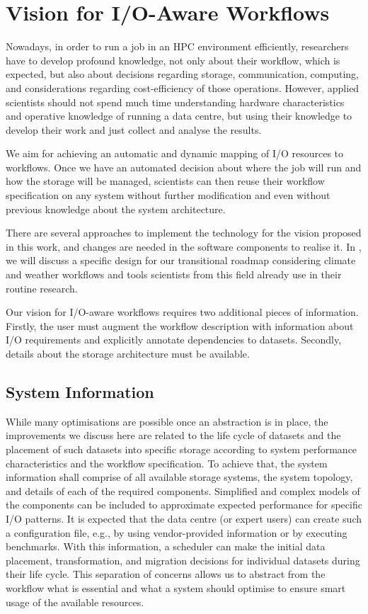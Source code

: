 \documentclass{superfri}
\begin{document}
\section{Vision for I/O-Aware Workflows}
\label{sec:vision}

Nowadays, in order to run a job in an HPC environment efficiently, researchers have to develop profound knowledge, not only about their workflow, which is expected, but also about decisions regarding storage, communication, computing, and considerations regarding cost-efficiency of those operations.
However, applied scientists should not spend much time understanding hardware characteristics and operative knowledge of running a data centre, but using their knowledge to develop their work and just collect and analyse the results.

We aim for achieving an automatic and dynamic mapping of I/O resources to workflows.
Once we have an automated decision about where the job will run and how the storage will be managed, scientists can then reuse their workflow specification on any system without further modification and even without previous knowledge about the system architecture.

There are several approaches to implement the technology for the vision proposed in this work, and changes are needed in the software components to realise it.
In , we will discuss a specific design for our transitional roadmap considering climate and weather workflows and tools scientists from this field already use in their routine research.

Our vision for I/O-aware workflows requires two additional pieces of information.
Firstly, the user must augment the workflow description with information about I/O requirements and explicitly annotate dependencies to datasets.
Secondly, details about the storage architecture must be available.

\subsection{System Information}

While many optimisations are possible once an abstraction is in place, the improvements we discuss here are related to the life cycle of datasets and the placement of such datasets into specific storage according to system performance characteristics and the workflow specification.
To achieve that, the system information shall comprise of all available storage systems, the system topology, and details of each of the required components.
Simplified and complex models of the components can be included to approximate expected performance for specific I/O patterns.
It is expected that the data centre (or expert users) can create such a configuration file, e.g., by using vendor-provided information or by executing benchmarks.
With this information, a scheduler can make the initial data placement, transformation, and migration decisions for individual datasets during their life cycle.
This separation of concerns allows us to abstract from the workflow what is essential and what a system should optimise to ensure smart usage of the available resources.
\end{document}
